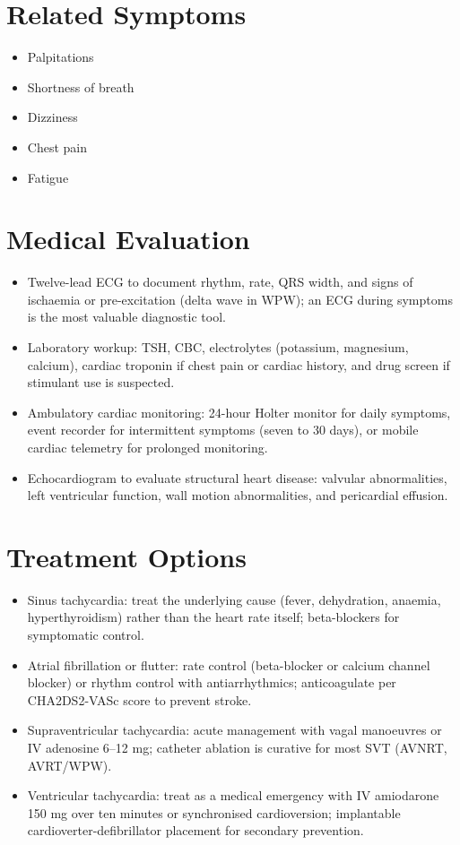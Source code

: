 \section*{Related Symptoms}
\begin{itemize}
  \item Palpitations
  \item Shortness of breath
  \item Dizziness
  \item Chest pain
  \item Fatigue
\end{itemize}

\section*{Medical Evaluation}
\begin{itemize}
  \item Twelve-lead ECG to document rhythm, rate, QRS width, and signs of ischaemia or pre-excitation (delta wave in WPW); an ECG during symptoms is the most valuable diagnostic tool.
  \item Laboratory workup: TSH, CBC, electrolytes (potassium, magnesium, calcium), cardiac troponin if chest pain or cardiac history, and drug screen if stimulant use is suspected.
  \item Ambulatory cardiac monitoring: 24-hour Holter monitor for daily symptoms, event recorder for intermittent symptoms (seven to 30 days), or mobile cardiac telemetry for prolonged monitoring.
  \item Echocardiogram to evaluate structural heart disease: valvular abnormalities, left ventricular function, wall motion abnormalities, and pericardial effusion.
\end{itemize}

\section*{Treatment Options}
\begin{itemize}
  \item Sinus tachycardia: treat the underlying cause (fever, dehydration, anaemia, hyperthyroidism) rather than the heart rate itself; beta-blockers for symptomatic control.
  \item Atrial fibrillation or flutter: rate control (beta-blocker or calcium channel blocker) or rhythm control with antiarrhythmics; anticoagulate per CHA2DS2-VASc score to prevent stroke.
  \item Supraventricular tachycardia: acute management with vagal manoeuvres or IV adenosine 6--12 mg; catheter ablation is curative for most SVT (AVNRT, AVRT/WPW).
  \item Ventricular tachycardia: treat as a medical emergency with IV amiodarone 150 mg over ten minutes or synchronised cardioversion; implantable cardioverter-defibrillator placement for secondary prevention.
\end{itemize}

